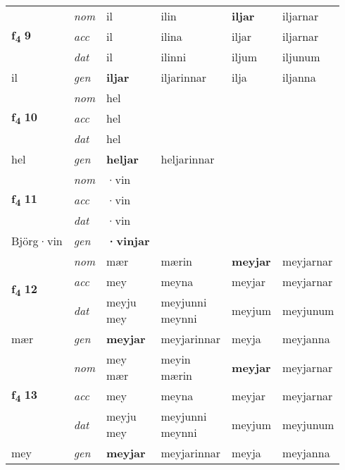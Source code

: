 \begin{longtable}[l]{X>{\footnotesize\itshape}XXXXX}
\multirow{3}{*}{{{\textbf{f{\textsubscript{4}}} \Large{\textbf{9}}}}} & nom & il & ilin & \textbf{iljar} & iljarnar \\*
 & acc & il & ilina & iljar & iljarnar \\*
 & dat & il & ilinni & iljum & iljunum \\*
 {\footnotesize{il}} & gen & \textbf{iljar} & iljarinnar & ilja & iljanna \\
\midrule

\multirow{3}{*}{{{\textbf{f{\textsubscript{4}}} \Large{\textbf{10}}}}} & nom & hel &  & \textbf{} &  \\*
 & acc & hel &  &  &  \\*
 & dat & hel &  &  &  \\*
 {\footnotesize{hel}} & gen & \textbf{heljar} & heljarinnar &  &  \\
\midrule

\multirow{3}{*}{{{\textbf{f{\textsubscript{4}}} \Large{\textbf{11}}}}} & nom & ·vin &  & \textbf{} &  \\*
 & acc & ·vin &  &  &  \\*
 & dat & ·vin &  &  &  \\*
 {\footnotesize{Björg\allowbreak ·vin}} & gen & \textbf{·vinjar} &  &  &  \\
\midrule

\multirow{3}{*}{{{\textbf{f{\textsubscript{4}}} \Large{\textbf{12}}}}} & nom & mær & mærin & \textbf{meyjar} & meyjarnar \\*
 & acc & mey & meyna & meyjar & meyjarnar \\*
 & dat & \specialcell{meyju\\ mey} & \specialcell{meyjunni\\ meynni} & meyjum & meyjunum \\*
 {\footnotesize{mær}} & gen & \textbf{meyjar} & meyjarinnar & meyja & meyjanna \\
\midrule

\multirow{3}{*}{{{\textbf{f{\textsubscript{4}}} \Large{\textbf{13}}}}} & nom & \specialcell{mey\\ mær} & \specialcell{meyin\\ mærin} & \textbf{meyjar} & meyjarnar \\*
 & acc & mey & meyna & meyjar & meyjarnar \\*
 & dat & \specialcell{meyju\\ mey} & \specialcell{meyjunni\\ meynni} & meyjum & meyjunum \\*
 {\footnotesize{mey}} & gen & \textbf{meyjar} & meyjarinnar & meyja & meyjanna \\
\midrule


\end{longtable}
